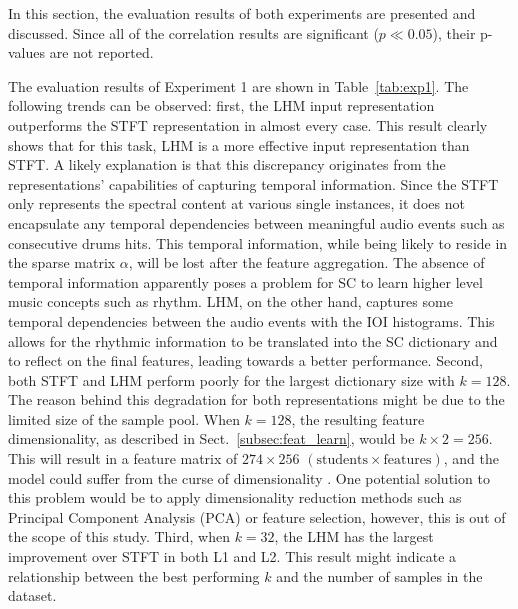 \documentclass{ws-ijsc}
\begin{document}
In this section, the evaluation results of both experiments are presented and discussed. Since all of the correlation results are significant ($p\ll 0.05$), their p-values are not reported.  

The evaluation results of Experiment 1 are shown in Table~\ref{tab:exp1}. The following trends can be observed: first, the LHM input representation outperforms the STFT representation in almost every case. This result clearly shows that for this task, LHM is a more effective input representation than STFT. A likely explanation is that this discrepancy originates from the representations' capabilities of capturing temporal information. Since the STFT only represents the spectral content at various single instances, it does not encapsulate any temporal dependencies between meaningful audio events such as consecutive drums hits. This temporal information, while being likely to reside in the sparse matrix $\alpha$, will be lost after the feature aggregation. The absence of temporal information apparently poses a problem for SC to learn higher level music concepts such as rhythm. LHM, on the other hand, captures some temporal dependencies between the audio events with the IOI histograms. This allows for the rhythmic information to be translated into the SC dictionary and to reflect on the final features, leading towards a better performance. 
Second, both STFT and LHM perform poorly for the largest dictionary size with $k = 128$. The reason behind this degradation for both representations might be due to the limited size of the sample pool. When $k = 128$, the resulting feature dimensionality, as described in Sect.~\ref{subsec:feat_learn}, would be $k \times 2 = 256$. This will result in a feature matrix of $274 \times 256$ $(\text{students} \times \text{features})$, and the model could suffer from the curse of dimensionality \cite{Bishop2006}. One potential solution to this problem would be to apply dimensionality reduction methods such as Principal Component Analysis (PCA) or feature selection, however, this is out of the scope of this study. 
Third, when $k = 32$, the LHM has the largest improvement over STFT in both L1 and L2. This result might indicate a relationship between the best performing $k$ and the number of samples in the dataset.
\end{document}
